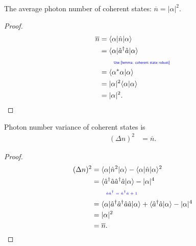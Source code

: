 \documentclass[../../note.tex]{subfiles}
\begin{document}
\begin{lemma}
    \label{lemma: The average photon number of coherent states}
    The average photon number of coherent states: $\overline{n} = \vert \alpha \vert^2$.
\end{lemma}
\begin{proof}
\begin{align}
    \overline{n}
    &= \langle \alpha \vert \hat{n} \vert \alpha \rangle  \\
    &= \langle \alpha \vert \hat{a}^\dagger \hat{a} \vert \alpha \rangle \\
    &\qquad\text{\color{blue}{\tiny\sffamily Use \ref{lemma: coherent state robust}}} \nonumber \\
    &= \langle \alpha^\ast \alpha \vert \alpha \rangle \\
    &= \vert \alpha \vert^2 \langle \alpha \vert \alpha \rangle \\
    &= \vert \alpha \vert^2.
\end{align}
\end{proof}

\begin{lemma}
    Photon number variance of coherent states is
    \begin{align}
        (\Delta n)^2
        &= \overline{n}.
    \end{align}
\end{lemma}
\begin{proof}
    \begin{align}
        (\Delta n)^2
        &= \langle \alpha \vert \hat{n}^2 \vert \alpha \rangle - \langle \alpha \vert \hat{n} \vert \alpha \rangle^2 \\
        &= \langle \hat{a}^\dagger \hat{a} \hat{a}^\dagger \hat{a} \vert \alpha \rangle - \vert \alpha \vert^4 \\
        &\qquad\text{\color{blue}{\tiny\sffamily $\hat{a} \hat{a}^\dagger = \hat{a}^\dagger \hat{a} + 1$}} \nonumber \\
        &= \langle \alpha \vert \hat{a}^\dagger \hat{a}^\dagger \hat{a} \hat{a} \vert \alpha \rangle + \langle \hat{a}^\dagger \hat{a} \vert \alpha \rangle - \vert \alpha \vert^4 \\
        &= \vert \alpha \vert^2 \\
        &= \overline{n}.
    \end{align}
\end{proof}
\end{document}
